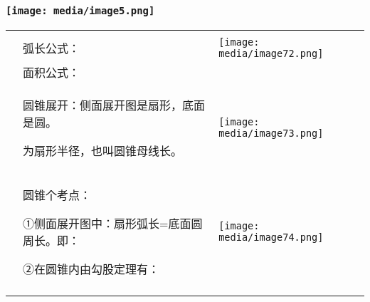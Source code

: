 \documentclass[a4paper,11pt,UTF8]{ctexart}
\begin{document}
\hypertarget{ux5b66ux79d1ux7f51www.zxxk.com--ux6559ux80b2ux8d44ux6e90ux95e8ux6237ux63d0ux4f9bux8bd5ux9898ux8bd5ux5377ux6559ux6848ux8bfeux4ef6ux6559ux5b66ux8bbaux6587ux7d20ux6750ux7b49ux5404ux7c7bux6559ux5b66ux8d44ux6e90ux5e93ux4e0bux8f7dux8fd8ux6709ux5927ux91cfux4e30ux5bccux7684ux6559ux5b66ux8d44ux8baf-21}{%
\subsubsection{\texorpdfstring{\protect\texttt{[image: media/image5.png]}}{学科网(www.zxxk.com)-\/-教育资源门户，提供试题试卷、教案、课件、教学论文、素材等各类教学资源库下载，还有大量丰富的教学资讯！}}\label{ux5b66ux79d1ux7f51www.zxxk.com--ux6559ux80b2ux8d44ux6e90ux95e8ux6237ux63d0ux4f9bux8bd5ux9898ux8bd5ux5377ux6559ux6848ux8bfeux4ef6ux6559ux5b66ux8bbaux6587ux7d20ux6750ux7b49ux5404ux7c7bux6559ux5b66ux8d44ux6e90ux5e93ux4e0bux8f7dux8fd8ux6709ux5927ux91cfux4e30ux5bccux7684ux6559ux5b66ux8d44ux8baf-21}}

\begin{longtable}[]{@{}lll@{}}
\toprule
\endhead
& &\tabularnewline
& 弧长公式： &
\texttt{[image: media/image72.png]}\tabularnewline
& 面积公式： &\tabularnewline
\begin{minipage}[t]{0.30\columnwidth}\raggedright
\strut
\end{minipage} & \begin{minipage}[t]{0.30\columnwidth}\raggedright
圆锥展开：侧面展开图是扇形，底面是圆。

为扇形半径，也叫圆锥母线长。\strut
\end{minipage} & \begin{minipage}[t]{0.30\columnwidth}\raggedright
\texttt{[image: media/image73.png]}\strut
\end{minipage}\tabularnewline
\begin{minipage}[t]{0.30\columnwidth}\raggedright
\strut
\end{minipage} & \begin{minipage}[t]{0.30\columnwidth}\raggedright
圆锥个考点：

①侧面展开图中：扇形弧长=底面圆周长。即：

②在圆锥内由勾股定理有：\strut
\end{minipage} & \begin{minipage}[t]{0.30\columnwidth}\raggedright
\texttt{[image: media/image74.png]}\strut
\end{minipage}\tabularnewline
& &\tabularnewline
\bottomrule
\end{longtable}
\end{document}

